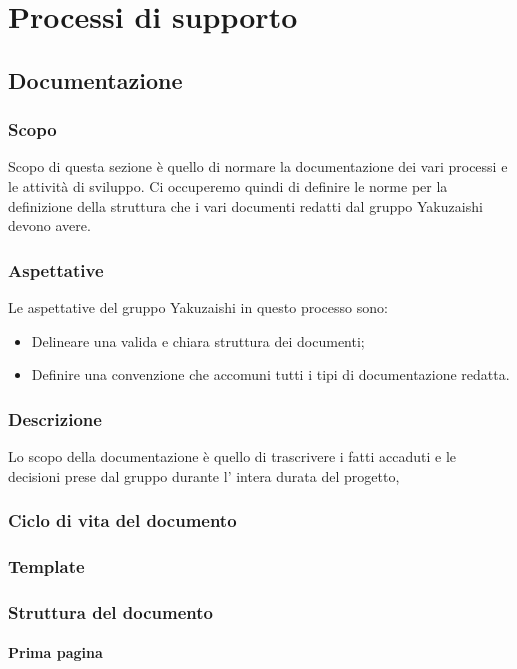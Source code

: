 \section{Processi di supporto}\label{section:processi_supporto}
\subsection{Documentazione}\label{subsection: documentazione}
\subsubsection{Scopo}\label{subsubsection: scopo}
Scopo di questa sezione è quello di normare la documentazione dei vari processi e le attività di sviluppo.
Ci occuperemo quindi di definire le norme per la definizione della struttura che i vari documenti redatti dal gruppo Yakuzaishi devono avere.
\subsubsection{Aspettative}
Le aspettative del gruppo Yakuzaishi in questo processo sono:
\begin{itemize}
    \item Delineare una valida e chiara struttura dei documenti;
    \item Definire una convenzione che accomuni tutti i tipi di documentazione redatta.
 \end {itemize}
\subsubsection{Descrizione}
Lo scopo della documentazione è quello di trascrivere i fatti accaduti e le decisioni prese dal gruppo durante l' intera durata del progetto, 
\subsubsection{Ciclo di vita del documento}

\subsubsection{Template}

\subsubsection{Struttura del documento}
\paragraph{Prima pagina}


